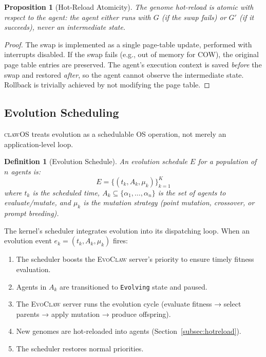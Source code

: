 \documentclass{article}
\newtheorem{proposition}[theorem]{Proposition}
\newtheorem{definition}{Definition}
\newcommand{\clawos}{\textsc{clawOS}}
\newcommand{\evoclaw}{\textsc{EvoClaw}}
\begin{document}
\begin{proposition}[Hot-Reload Atomicity]
The genome hot-reload is atomic with respect to the agent: the agent either runs with $G$ (if the swap fails) or $G'$ (if it succeeds), never an intermediate state.
\end{proposition}

\begin{proof}
The swap is implemented as a single page-table update, performed with interrupts disabled. If the swap fails (e.g., out of memory for COW), the original page table entries are preserved. The agent's execution context is saved \emph{before} the swap and restored \emph{after}, so the agent cannot observe the intermediate state. Rollback is trivially achieved by not modifying the page table.
\end{proof}

\subsection{Evolution Scheduling}

\clawos{} treats evolution as a schedulable OS operation, not merely an application-level loop.

\begin{definition}[Evolution Schedule]
An evolution schedule $E$ for a population of $n$ agents is:
$$E = \{(t_k, A_k, \mu_k)\}_{k=1}^{K}$$
where $t_k$ is the scheduled time, $A_k \subseteq \{\alpha_1, \ldots, \alpha_n\}$ is the set of agents to evaluate/mutate, and $\mu_k$ is the mutation strategy (point mutation, crossover, or prompt breeding).
\end{definition}

The kernel's scheduler integrates evolution into its dispatching loop. When an evolution event $e_k = (t_k, A_k, \mu_k)$ fires:

\begin{enumerate}[leftmargin=*]
    \item The scheduler boosts the \evoclaw{} server's priority to ensure timely fitness evaluation.
    \item Agents in $A_k$ are transitioned to \texttt{Evolving} state and paused.
    \item The \evoclaw{} server runs the evolution cycle (evaluate fitness → select parents → apply mutation → produce offspring).
    \item New genomes are hot-reloaded into agents (Section~\ref{subsec:hotreload}).
    \item The scheduler restores normal priorities.
\end{enumerate}
\end{document}
